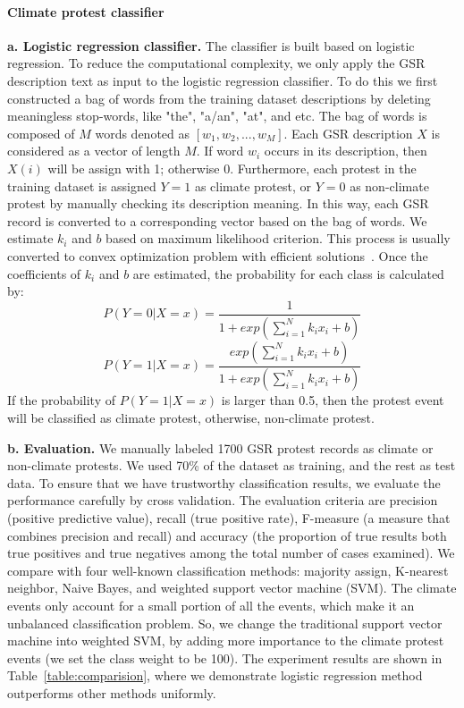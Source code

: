 \documentclass[9pt,twocolumn,twoside]{pnas-new}
\begin{document}
{\paragraph{Climate protest classifier}
\textbf{a. Logistic regression classifier.}
The classifier is built based on logistic regression.
To reduce the computational complexity, we only apply the GSR description text as input to the logistic regression classifier. To do this we first constructed a bag of words from the training dataset descriptions by deleting meaningless stop-words, like "the", "a/an", "at", and etc. The bag of words is composed of $M$ words denoted as $[w_1, w_2, ..., w_M]$.
Each GSR description $X$ is considered as a vector of length $M$. If word $w_i$ occurs in its description, then $X(i)$ will be assign with 1; otherwise 0. Furthermore, each protest in the training dataset is assigned $Y=1$ as climate protest, or $Y=0$ as non-climate protest by manually checking its description meaning. In this way, each GSR record is converted to a corresponding vector based on the bag of words. We estimate $k_i$ and $b$ based on maximum likelihood criterion. This process is usually converted to convex optimization problem with efficient solutions~\cite{james2013introduction}. Once the coefficients of $k_i$ and $b$ are estimated, the probability for each class is calculated by:
$$P(Y = 0| X=x)= \frac{1}{1+exp( {\sum_{i=1}^{N} k_ix_i}+b)}$$
$$P(Y = 1| X=x)= \frac{exp( {\sum_{i=1}^{N} k_ix_i}+b)}{1+exp( {\sum_{i=1}^{N} k_ix_i}+b)}$$
If the probability of $P(Y = 1| X=x)$ is larger than 0.5, then the protest event will be classified as climate protest, otherwise, non-climate protest.


\textbf{b. Evaluation.}
We manually labeled 1700 GSR protest records as climate or non-climate protests. We used 70\% of the dataset as training, and the rest as test data. To ensure that we have trustworthy classification results, we evaluate the performance carefully by cross validation. The evaluation criteria are precision (positive predictive value), recall (true positive rate), F-measure (a measure that combines precision and recall) and accuracy (the proportion of true results both true positives and true negatives among the total number of cases examined). We compare with four well-known classification methods: majority assign, K-nearest neighbor, Naive Bayes, and weighted support vector machine (SVM). The climate events only account for a small portion of all the events, which make it an unbalanced classification problem. So, we change the traditional support vector machine into weighted SVM, by adding more importance to the climate protest events (we set the class weight to be 100). The experiment results are shown in Table~\ref{table:comparision}, where we demonstrate logistic regression method outperforms other methods uniformly.


}
\end{document}
